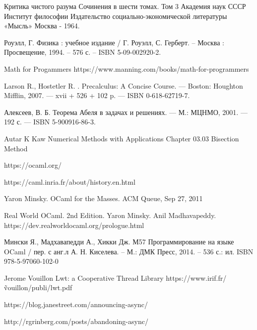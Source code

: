 \begingroup
\renewcommand{\section}[2]{\Anonchapter{Список использованных источников}}
\begin{thebibliography}{00}

    Критика чистого разума
    Сочинения в шести томах.
    Том 3
    Академия наук СССР
    Институт философии
    Издательство социально-экономической литературы
    «Мысль»
    Москва - 1964. \TODO

    Роуэлл, Г. Физика : учебное издание / Г. Роуэлл, С. Герберт. -- Москва : Просвещение, 1994. -- 576 с. -- ISBN 5-09-002920-2.

    Math for Progammers \TODO
    https://www.manning.com/books/math-for-programmers

    Larson R., Hostetler R. . Precalculus: A Concise Course. — Boston:
    Houghton Mifflin, 2007. — xvii + 526 + 102 p. — ISBN 0-618-62719-7. \TODO

    Алексеев, В. Б. Теорема Абеля в задачах и решениях. — М.: МЦНМО, 2001. — 192 с. — ISBN 5-900916-86-3. \TODO

    \TODO Autar K Kaw Numerical Methods with Applications Chapter 03.03 Bisection Method

    https://ocaml.org/ \TODO

    https://caml.inria.fr/about/history.en.html \TODO

    Yaron Minsky. OCaml for the Masses. ACM Queue, Sep 27, 2011 \TODO

    Real World OCaml. 2nd Edition. Yaron Minsky. Anil Madhavapeddy.
    https://dev.realworldocaml.org/prologue.html \TODO

    Мински Я., Мадхавапедди А., Хикки Дж. 
    М57 Программирование на языке OCaml / пер. с анг.л А. Н. Киселева. – 
    М.: ДМК Пресс, 2014. – 536 с.: ил.
    ISBN 978-5-97060-102-0
    \TODO

    Jerome Vouillon Lwt: a Cooperative Thread Library \TODO
    https://www.irif.fr/\~vouillon/publi/lwt.pdf

    https://blog.janestreet.com/announcing-async/ \TODO

    http://rgrinberg.com/posts/abandoning-async/ \TODO

\end{thebibliography}
\endgroup

\clearpage
